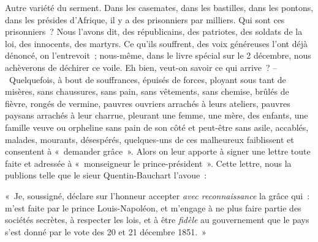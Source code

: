\documentclass[french,twoside]{book} %
\newenvironment{quoteblock}%
  {\begin{quoting}}
  {\end{quoting}}
\newenvironment{quotebar}{%
    \def\FrameCommand{{\color{rubric!10!}\vrule width 0.5em} \hspace{0.9em}}%
    \def\OuterFrameSep{0pt} %
    \MakeFramed {\advance\hsize-\width \FrameRestore}
  }%
  {%
    \endMakeFramed
  }
\renewenvironment{quoteblock}%
  {%
    \savenotes
    \setstretch{0.9}
    \begin{quotebar}
    \smallskip
  }
  {%
    \smallskip
    \end{quotebar}
    \spewnotes
  }
\begin{document}
Autre variété du serment. Dans les casemates, dans les bastilles, dans les pontons, dans les présides d’Afrique, il y a des prisonniers par milliers. Qui sont ces prisonniers ? Nous l’avons dit, des républicains, des patriotes, des soldats de la loi, des innocents, des martyrs. Ce qu’ils souffrent, des voix généreuses l’ont déjà dénoncé, on l’entrevoit ; nous-même, dans le livre spécial sur le 2 décembre, nous achèverons de déchirer ce voile. Eh bien, veut-on savoir ce qui arrive ? – Quelquefois, à bout de souffrances, épuisés de forces, ployant sous tant de misères, sans chaussures, sans pain, sans vêtements, sans chemise, brûlés de fièvre, rongés de vermine, pauvres ouvriers arrachés à leurs ateliers, pauvres paysans arrachés à leur charrue, pleurant une femme, une mère, des enfants, une famille veuve ou orpheline sans pain de son côté et peut-être sans asile, accablés, malades, mourants, désespérés, quelques-uns de ces malheureux faiblissent et consentent à « demander grâce ». Alors on leur apporte à signer une lettre toute faite et adressée à « monseigneur le prince-président ». Cette lettre, nous la publions telle que le sieur Quentin-Bauchart l’avoue :\par

\begin{quoteblock}
 \noindent « Je, soussigné, déclare sur l’honneur accepter \emph{avec reconnaissance} la grâce qui : m’est faite par le prince Louis-Napoléon, et m’engage à ne plus faire partie des sociétés secrètes, à respecter les lois, et à être \emph{fidèle} au gouvernement que le pays s’est donné par le vote des 20 et 21 décembre 1851. »
 \end{quoteblock}
\end{document}

